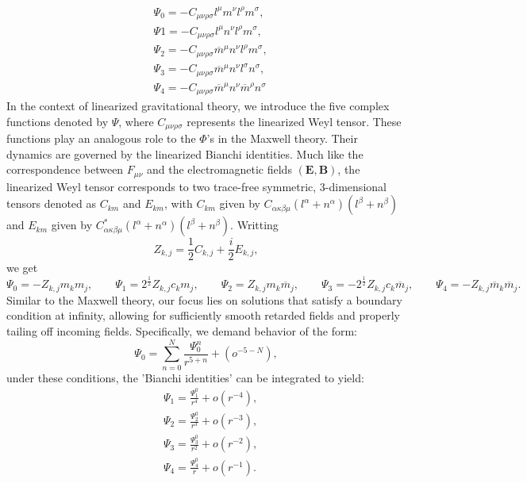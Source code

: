 \begin{align}\label{eq:MaxcomplexFuc}
  & \Psi_{0} = -C_{\mu\nu\rho\sigma}l^{\mu}m^{\nu}l^{\rho}m^{\sigma}, \nonumber \\ 
  & \Psi{1} = -C_{\mu\nu\rho\sigma}l^{\mu}n^{\nu}l^{\rho}m^{\sigma}, \nonumber \\ 
  & \Psi_{2} = -C_{\mu\nu\rho\sigma}{\overline{{{m}}}^{\mu}n^{\nu}l^{\rho}m^{\sigma}}, \nonumber \\ 
  & \Psi_{3} = -C_{\mu\nu\rho\sigma}{\overline{{{m}}}^{\mu}n^{\nu}l^{\sigma}}n^{\sigma}, \nonumber \\
  & \Psi_{4} = -C_{\mu\nu\rho\sigma}{\overline{{{m}}}^{\mu}n^{\nu}\overline{{{m}}}^{\rho}}n^{\sigma}
\end{align}
In the context of linearized gravitational theory, we introduce the five complex functions denoted by $\Psi$, where $C_{\mu\nu\rho\sigma}$ represents the linearized Weyl tensor. These functions play an analogous role to the $\Phi$'s in the Maxwell theory. Their dynamics are governed by the linearized Bianchi identities. Much like the correspondence between $F_{\mu \nu}$ and the electromagnetic fields $(\boldsymbol{E}, \boldsymbol{B})$, the linearized Weyl tensor corresponds to two trace-free symmetric, 3-dimensional tensors denoted as $C_{km}$ and $E_{km}$, with $C_{km}$ given by $C_{\alpha \kappa \beta \mu}(l^{\alpha}+n^{\alpha})(l^{\beta}+n^{\beta})$ and $E_{km}$ given by $C_{\alpha \kappa \beta \mu}^{*}(l^{\alpha}+n^{\alpha})(l^{\beta}+n^{\beta})$. Writting $$Z_{k,j} = \frac{1}{2}C_{k,j} + \frac{i}{2}E_{k,j},$$ we get $$\Psi_{0} = - Z_{k,j}m_{k}m_{j}, \qquad \Psi_{1} = 2^{\frac{1}{2}}Z_{k,j}c_{k}m_{j}, \qquad \Psi_{2} = Z_{k,j}m_{k}\overline{m}_{j}, \qquad \Psi_{3} = - 2^{\frac{1}{2}}Z_{k,j}c_{k}\overline{m}_{j}, \qquad \Psi_{4} = -Z_{k,j}\overline{m}_{k}\overline{m}_{j}.$$
Similar to the Maxwell theory, our focus lies on solutions that satisfy a boundary condition at infinity, allowing for sufficiently smooth retarded fields and properly tailing off incoming fields. Specifically, we demand behavior of the form:
\begin{equation}\label{eq:Psi0ansatz}
  \Psi_{0}=\sum_{n=0}^{N}\frac{\Psi_{0}^{n}}{r^{5+n}}+(o^{-5-N}),
\end{equation}
under these conditions, the 'Bianchi identities' can be integrated to yield:
\begin{align}\label{eq:Psiintegrals}
  & \Psi_{1}=\frac{\Psi_{1}^{0}}{r^{4}}+o({r}^{-4}), \nonumber \\ 
  & \Psi_{2}=\frac{\Psi_{2}^{0}}{r^{3}}+o({r}^{-3}), \nonumber \\ 
  & \Psi_{3}=\frac{\Psi_{3}^{0}}{r^{2}}+o({r}^{-2}), \nonumber \\
  & \Psi_{4}=\frac{\Psi_{4}^{0}}{r}+o({r}^{-1}).
\end{align}

